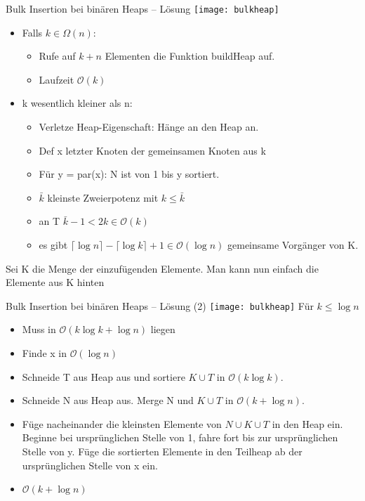 \documentclass[18pt]{beamer}
\newcommand{\Oh}{\mathcal{O}}
\begin{document}
\begin{frame}{Bulk Insertion bei binären Heaps -- Lösung}
\texttt{[image: bulkheap]}
\begin{itemize}
 \item Falls $k \in \Omega(n)$:
 \begin{itemize}
  \item Rufe auf $k+n$ Elementen die Funktion buildHeap auf.
  \item Laufzeit $\Oh(k)$
 \end{itemize}
  \item k wesentlich kleiner als n:
  \begin{itemize}
   \item Verletze Heap-Eigenschaft: Hänge an den Heap an.
   \item Def x letzter Knoten der gemeinsamen Knoten aus k
   \item Für y = par(x): N ist von 1 bis y sortiert.
   \item $\bar{k}$ kleinste Zweierpotenz mit $k \leq \bar{k}$
   \item an T $\bar{k} - 1 < 2k \in \Oh(k)$
   \item es gibt $\lceil \log n \rceil - \lceil \log k \rceil + 1 \in \Oh(\log n)$ gemeinsame Vorgänger von K.
  \end{itemize}

\end{itemize}

  
 Sei K die Menge der einzufügenden Elemente. Man kann nun einfach die Elemente aus K hinten
 
\end{frame}

\begin{frame}{Bulk Insertion bei binären Heaps -- Lösung (2)}
\texttt{[image: bulkheap]}
Für $k \leq \log n$
\begin{itemize}
 \item Muss in $\Oh(k \log k + \log n)$ liegen
 \item Finde x in $\Oh(\log n)$
 \item Schneide T aus Heap aus und sortiere $K \cup T$ in $\Oh(k \log k)$.
 \item Schneide N aus Heap aus. Merge N und $K \cup T$ in $\Oh(k + \log n)$.
 \item Füge nacheinander die kleinsten Elemente von $N \cup K \cup T$ in den 
 Heap ein. Beginne bei ursprünglichen Stelle von 1, fahre fort bis zur ursprünglichen Stelle von y.
 Füge die sortierten Elemente in den Teilheap ab der ursprünglichen Stelle von x ein.
 
 \item $\Oh(k + \log n)$
 
\end{itemize}
\end{frame}
\end{document}
